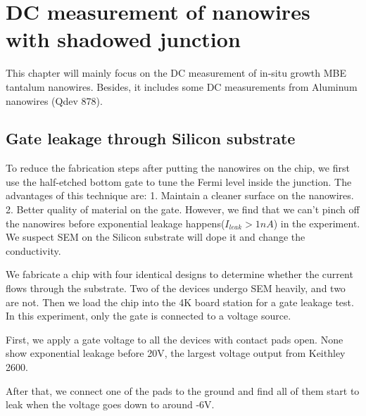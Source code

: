 \clearpage
\section{DC measurement of nanowires with shadowed junction}
This chapter will mainly focus on the DC measurement of in-situ growth MBE tantalum nanowires. Besides, it includes some DC measurements from Aluminum nanowires (Qdev 878).

\subsection{Gate leakage through Silicon substrate}

To reduce the fabrication steps after putting the nanowires on the chip,  we first use the half-etched bottom gate to tune the Fermi level inside the junction. The advantages of this technique are: 1. Maintain a cleaner surface on the nanowires. 2. Better quality of material on the gate. However, we find that we can't pinch off the nanowires before exponential leakage happens($I_{leak} > 1nA$) in the experiment. We suspect SEM on the Silicon substrate will dope it and change the conductivity. 

We fabricate a chip with four identical designs to determine whether the current flows through the substrate. Two of the devices undergo SEM heavily, and two are not. Then we load the chip into the 4K board station for a gate leakage test. In this experiment, only the gate is connected to a voltage source. 

First, we apply a gate voltage to all the devices with contact pads open. None show exponential leakage before 20V, the largest voltage output from Keithley 2600. 

After that, we connect one of the pads to the ground and find all of them start to leak when the voltage goes down to around -6V. 

